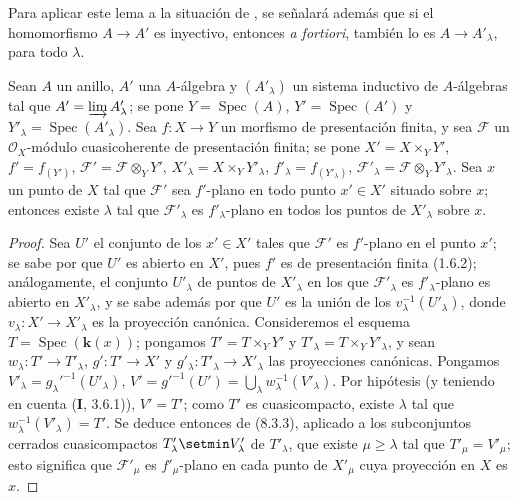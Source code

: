 
Para aplicar este lema a la situación de , se señalará además
que si el homomorfismo $A\to A'$ es inyectivo, entonces
\emph{a fortiori}, también lo es $A\to A'_{\lambda}$, para todo
$\lambda$.

\begin{lemma}[11.5.5.2]
\label{IV.11.5.5.2}
Sean $A$ un anillo, $A'$ una $A$-álgebra y $(A'_{\lambda})$ un sistema inductivo
de $A$-álgebras tal que $A'=\varinjlim A'_{\lambda}$; se pone $Y=\operatorname{Spec}(A)$, $Y'=\operatorname{Spec}(A')$ y $Y'_{\lambda}=\operatorname{Spec}(A'_{\lambda})$.
Sea $f:X\to Y$ un morfismo de presentación finita, y sea $\mathcal F$ un $\mathcal O_X$-módulo cuasicoherente de
presentación finita; se pone $X'=X\times_Y Y'$, $f'=f_{(Y')}$, $\mathcal F'=\mathcal F\otimes_Y Y'$, $X'_{\lambda}=X\times_Y Y'_{\lambda}$, $f'_{\lambda}=f_{(Y'_{\lambda})}$,
$\mathcal F'_{\lambda}=\mathcal F\otimes_Y Y'_{\lambda}$. Sea $x$ un punto de $X$ tal que $\mathcal F'$ sea $f'$-plano en todo punto $x'\in X'$ situado sobre $x$;
entonces existe $\lambda$ tal que $\mathcal F'_{\lambda}$ es $f'_{\lambda}$-plano en todos los puntos de $X'_{\lambda}$ sobre $x$.
\end{lemma}

\begin{proof}
Sea $U'$ el conjunto de los $x'\in X'$ tales que $\mathcal F'$ es $f'$-plano en el punto $x'$; se sabe por 
que $U'$ es abierto en $X'$, pues $f'$ es de presentación finita (1.6.2); análogamente, el
conjunto $U'_{\lambda}$ de puntos de $X'_{\lambda}$ en los que $\mathcal F'_{\lambda}$ es $f'_{\lambda}$-plano es abierto en $X'_{\lambda}$, y se sabe además por
 que $U'$ es la unión de los $v_{\lambda}^{-1}(U'_{\lambda})$, donde $v_{\lambda}:X'\to X'_{\lambda}$ es la proyección canónica.
Consideremos el esquema $T=\operatorname{Spec}(\boldsymbol{k}(x))$; pongamos $T'=T\times_Y Y'$ y $T'_{\lambda}=T\times_Y Y'_{\lambda}$, y sean
$w_{\lambda}:T'\to T'_{\lambda}$, $g':T'\to X'$ y $g'_{\lambda}:T'_{\lambda}\to X'_{\lambda}$ las proyecciones canónicas. Pongamos $V'_{\lambda}=g_{\lambda}'^{-1}(U'_{\lambda})$,
$V'=g'^{-1}(U')=\bigcup_{\lambda}w_{\lambda}^{-1}(V'_{\lambda})$. Por hipótesis (y teniendo en cuenta (\textbf I, 3.6.1)), $V'=T'$;
como $T'$ es cuasicompacto, existe $\lambda$ tal que $w_{\lambda}^{-1}(V'_{\lambda})=T'$. Se deduce entonces de (8.3.3),
aplicado a los subconjuntos cerrados cuasicompactos $T'_{\lambda}\setmin V'_{\lambda}$ de $T'_{\lambda}$, que existe $\mu\geq\lambda$ tal
que $T'_{\mu}=V'_{\mu}$; esto significa que $\mathcal F'_{\mu}$ es $f'_{\mu}$-plano en cada punto de $X'_{\mu}$ cuya proyección
en $X$ es $x$.
\end{proof}

